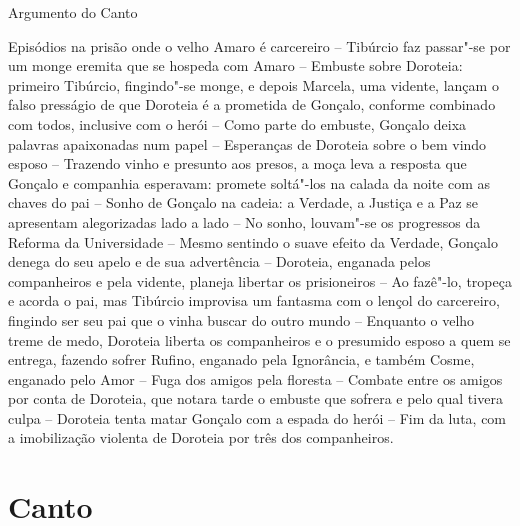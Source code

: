 \pagebreak

\mbox{}\vfill
\thispagestyle{empty}
\noindent Argumento do Canto 
\medskip

{\footnotesize\noindent Episódios na prisão onde o velho Amaro é carcereiro -- Tibúrcio faz passar"-se por um
monge eremita que se hospeda com Amaro -- Embuste sobre Doroteia: primeiro
Tibúrcio, fingindo"-se monge, e depois Marcela, uma vidente, lançam o falso
presságio de que Doroteia é a prometida de Gonçalo, conforme combinado com todos,
inclusive com o herói -- Como parte do embuste, Gonçalo deixa palavras apaixonadas num papel 
-- Esperanças de Doroteia sobre o bem vindo esposo -- Trazendo vinho e presunto aos
presos, a moça leva a resposta que Gonçalo e companhia esperavam: promete soltá"-los
na calada da noite com as chaves do pai -- Sonho  de Gonçalo na cadeia: a Verdade,
a Justiça e a Paz se apresentam alegorizadas lado a lado -- No sonho, louvam"-se os
progressos da Reforma da Universidade -- Mesmo sentindo o suave efeito da Verdade, 
Gonçalo denega do seu apelo e de sua advertência -- Doroteia, enganada pelos companheiros
e pela vidente, planeja libertar os prisioneiros -- Ao fazê"-lo, tropeça e acorda o pai,
mas Tibúrcio improvisa um fantasma com o lençol do carcereiro, fingindo ser seu pai
que o vinha buscar do outro mundo -- Enquanto o velho treme de medo, Doroteia liberta os companheiros
e o presumido esposo a quem se entrega, fazendo sofrer Rufino, enganado pela Ignorância,
e também Cosme, enganado pelo Amor -- Fuga dos amigos pela floresta --  Combate entre os amigos por		\index{\Amor}
conta de Doroteia, que notara tarde o embuste que sofrera e pelo qual tivera culpa -- Doroteia
tenta matar Gonçalo com a espada do herói -- Fim da luta, com a imobilização violenta de Doroteia
por três dos companheiros.}


\chapter{Canto }

